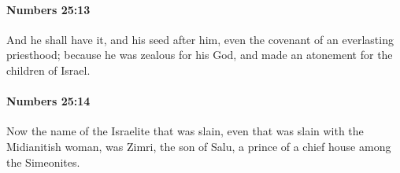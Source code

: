 		\paragraph{Numbers 25:13} %
			\label{NUMBERS-25-13}

			And he shall have it, and his seed after him, even the covenant of an everlasting priesthood; because he was zealous for his God, and made an atonement for the children of Israel.


		\paragraph{Numbers 25:14} %
			\label{NUMBERS-25-14}

			Now the name of the Israelite that was slain, even that was slain with the Midianitish woman, was Zimri, the son of Salu, a prince of a chief house among the Simeonites.


